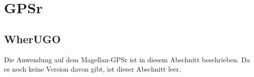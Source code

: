 \section{GPSr}

\subsection{WherUGO}
Die Anwendung auf dem Magellan-GPSr ist in diesem Abschnitt beschrieben. Da es noch keine Version davon gibt, ist dieser Abschnitt leer.